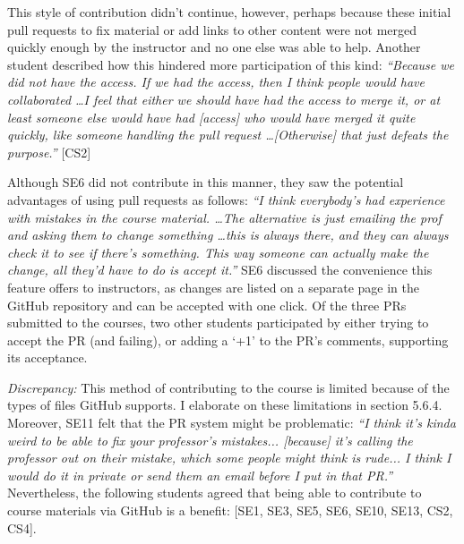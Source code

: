 This style of contribution didn't continue, however, perhaps because these initial pull requests to fix material or add links to other content were not merged quickly enough by the instructor and no one else was able to help. Another student described how this hindered more participation of this kind: \textit{``Because we did not have the access. If we had the access, then I think people would have collaborated \ldots I feel that either we should have had the access to merge it, or at least someone else would have had [access] who would have merged it quite quickly, like someone handling the pull request \ldots [Otherwise] that just defeats the purpose.''} [CS2]

Although SE6 did not contribute in this manner, they saw the potential advantages of using pull requests as follows: \textit{``I think everybody's had experience with mistakes in the course material. \ldots The alternative is just emailing the prof and asking them to change something \ldots this is always there, and they can always check it to see if there's something. This way someone can actually make the change, all they'd have to do is accept it.''} SE6 discussed the convenience this feature offers to instructors, as changes are listed on a separate page in the GitHub repository and can be accepted with one click. Of the three PRs submitted to the courses, two other students participated by either trying to accept the PR (and failing), or adding a `+1' to the PR's comments, supporting its acceptance.

\emph{Discrepancy:} This method of contributing to the course is limited because of the types of files GitHub supports. I elaborate on these limitations in section 5.6.4. Moreover, SE11 felt that the PR system might be problematic: \textit{``I think it's kinda weird to be able to fix your professor's mistakes... [because] it's calling the professor out on their mistake, which some people might think is rude... I think I would do it in private or send them an email before I put in that PR.''} Nevertheless, the following students agreed that being able to contribute to course materials via GitHub is a benefit: [SE1, SE3, SE5, SE6, SE10, SE13, CS2, CS4]. \\



